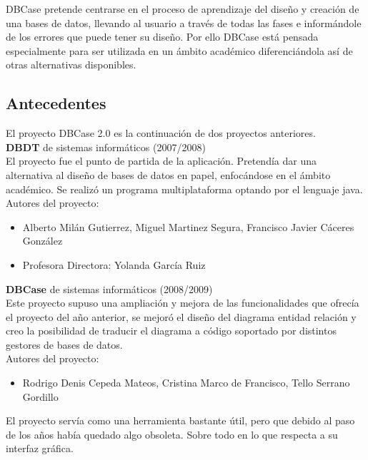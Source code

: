 DBCase pretende centrarse en el proceso de aprendizaje del diseño y creación de una bases de datos, llevando al usuario a través de todas las fases e informándole de los errores que puede tener su diseño. Por ello DBCase está pensada especialmente para ser utilizada en un ámbito académico diferenciándola así de otras alternativas disponibles.\\


\subsection{Antecedentes}
El proyecto DBCase 2.0 es la continuación de dos proyectos anteriores.\\

\textbf{DBDT} de sistemas informáticos (2007/2008)\\

El proyecto fue el punto de partida de la aplicación. Pretendía dar una alternativa al diseño de bases de datos en papel, enfocándose en el ámbito académico. Se realizó un programa multiplataforma optando por el lenguaje java.\\

Autores del proyecto:
\begin{itemize}
    \item Alberto Milán Gutierrez, Miguel Martinez Segura, Francisco Javier Cáceres González
    \item Profesora Directora: Yolanda García Ruiz
\end{itemize}

\textbf{DBCase} de sistemas informáticos (2008/2009)\\

Este proyecto supuso una ampliación y mejora de las funcionalidades que ofrecía el proyecto del año anterior, se mejoró el diseño del diagrama entidad relación y creo la posibilidad de traducir el diagrama a código soportado por distintos gestores de bases de datos. \\

Autores del proyecto:
\begin{itemize}
    \item Rodrigo Denis Cepeda Mateos, Cristina Marco de Francisco, Tello Serrano Gordillo
\end{itemize}
El proyecto servía como una herramienta bastante útil, pero que debido al paso de los años había quedado algo obsoleta. Sobre todo en lo que respecta a su interfaz gráfica.
